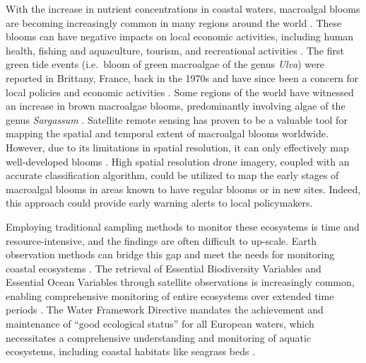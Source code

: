 \documentclass[
  number]{elsarticle}
\begin{document}
With the increase in nutrient concentrations in coastal waters,
macroalgal blooms are becoming increasingly common in many regions
around the world \citetext{\citealp[
]{sutton2011european}; \citealp{ye2011green}}. These blooms can have
negative impacts on local economic activities, including human health,
fishing and aquaculture, tourism, and recreational activities
\citetext{\citealp[ ]{villares1999nitrogen}; \citealp{ye2011green}}. The
first green tide events (i.e.~bloom of green macroalgae of the genus
\emph{Ulva}) were reported in Brittany, France, back in the 1970s and
have since been a concern for local policies and economic activities
\citep{menesguen2018marees}. Some regions of the world have witnessed an
increase in brown macroalgae blooms, predominantly involving algae of
the genus \emph{Sargassum} \citep{louime2017sargassum}. Satellite remote
sensing has proven to be a valuable tool for mapping the spatial and
temporal extent of macroalgal blooms worldwide. However, due to its
limitations in spatial resolution, it can only effectively map
well-developed blooms \citetext{\citealp[ ]{rs13081408}; \citealp[
]{klemas2012remote}; \citealp{HARO2023103451}}. High spatial resolution
drone imagery, coupled with an accurate classification algorithm, could
be utilized to map the early stages of macroalgal blooms in areas known
to have regular blooms or in new sites. Indeed, this approach could
provide early warning alerts to local policymakers.

Employing traditional sampling methods to monitor these ecosystems is
time and resource-intensive, and the findings are often difficult to
up-scale. Earth observation methods can bridge this gap and meet the
needs for monitoring coastal ecosystems
\citep{papathanasopoulou2019satellite}. The retrieval of Essential
Biodiversity Variables and Essential Ocean Variables through satellite
observations is increasingly common, enabling comprehensive monitoring
of entire ecosystems over extended time periods \citetext{\citealp[
]{ratnarajah2023monitoring}; \citealp{ZOFFOLI2020112020}}. The Water
Framework Directive \citep[WFD :][]{WFD2000} mandates the achievement
and maintenance of ``good ecological status'' for all European waters,
which necessitates a comprehensive understanding and monitoring of
aquatic ecosystems, including coastal habitats like seagrass beds
\citetext{\citealp[ ]{foden2007angiosperms}; \citealp[
]{nordlund2024one}; \citealp{Zoffoli2021}}.
\end{document}
